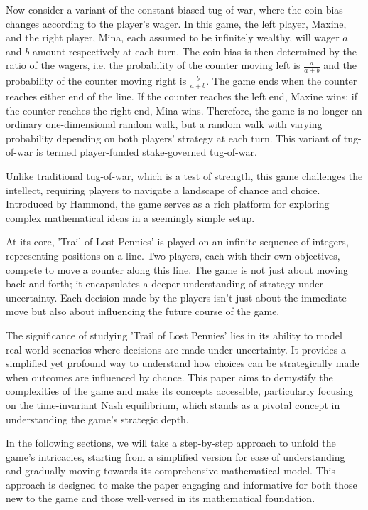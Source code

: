 \documentclass{article}
\begin{document}
Now consider a variant of the constant-biased tug-of-war, where the coin bias changes according to
the player's wager. In this game, the left player, Maxine, and the right player, Mina, each assumed
to be infinitely wealthy, will wager $a$ and $b$ amount respectively at each turn. The coin bias is
then determined by the ratio of the wagers, i.e. the probability of the counter moving left is
$\frac{a}{a+b}$ and the probability of the counter moving right is $\frac{b}{a+b}$. The game ends
when the counter reaches either end of the line. If the counter reaches the left end, Maxine wins;
if the counter reaches the right end, Mina wins. Therefore, the game is no longer an ordinary
one-dimensional random walk, but a random walk with varying probability depending on both players'
strategy at each turn. This variant of tug-of-war is termed player-funded stake-governed tug-of-war.

Unlike traditional tug-of-war, which is a
test of strength, this game challenges the intellect, requiring players to navigate a landscape of
chance and choice. Introduced by Hammond, the game serves as a rich platform for exploring complex
mathematical ideas in a seemingly simple setup.

At its core, 'Trail of Lost Pennies' is played on an infinite sequence of integers, representing
positions on a line. Two players, each with their own objectives, compete to move a counter along
this line. The game is not just about moving back and forth; it encapsulates a deeper understanding
of strategy under uncertainty. Each decision made by the players isn't just about the immediate move
but also about influencing the future course of the game.

The significance of studying 'Trail of Lost Pennies' lies in its ability to model real-world
scenarios where decisions are made under uncertainty. It provides a simplified yet profound way to
understand how choices can be strategically made when outcomes are influenced by chance. This paper
aims to demystify the complexities of the game and make its concepts accessible, particularly
focusing on the time-invariant Nash equilibrium, which stands as a pivotal concept in understanding
the game's strategic depth.

In the following sections, we will take a step-by-step approach to unfold the game's intricacies,
starting from a simplified version for ease of understanding and gradually moving towards its
comprehensive mathematical model. This approach is designed to make the paper engaging and
informative for both those new to the game and those well-versed in its mathematical foundation.
\end{document}
